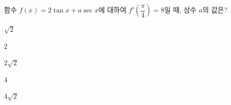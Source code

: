 함수 $f(x)=2\tan x+a\sec x$에 대하여 $f'\left(\dfrac{\pi}{4}\right)=8$일 때, 상수 $a$의 값은?
\begin{choices32}{\rule[-3ex]{0pt}{8ex}$\sqrt{2}$}{\rule[-3ex]{0pt}{8ex}$2$}{\rule[-3ex]{0pt}{8ex}$2\sqrt{2}$}{\rule[-3ex]{0pt}{8ex}$4$}{\rule[-3ex]{0pt}{8ex}$4\sqrt{2}$}\end{choices32}
